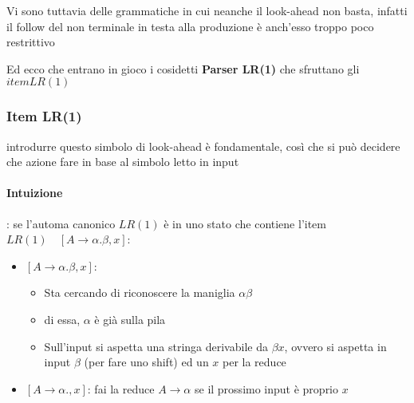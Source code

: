Vi sono tuttavia delle grammatiche in cui neanche il look-ahead non basta, infatti il follow del non terminale in testa alla produzione è anch'esso troppo poco restrittivo


Ed ecco che entrano in gioco i cosidetti \textbf{Parser LR(1)} che sfruttano gli $item LR(1)$
\subsubsection{Item LR(1)}
introdurre questo simbolo di look-ahead è fondamentale, così che si può decidere che azione fare in base al simbolo letto in input 

\paragraph{Intuizione}: se l'automa canonico $LR(1)$ è in uno stato che contiene l'item $LR(1)\quad [A\to\alpha.\beta,x]$:

\begin{itemize}
    \item $[A\to\alpha.\beta,x]$:
    \begin{itemize}
        \item Sta cercando di riconoscere la maniglia $\alpha \beta$
        \item di essa, $\alpha$ è già sulla pila
        \item Sull'input si aspetta una stringa derivabile da $\beta x$, ovvero si aspetta in input $\beta$ (per fare uno shift) ed un $x$ per la reduce
    \end{itemize}
    \item $[A\to\alpha.,x]$: fai la reduce $A\to \alpha$ se il prossimo input è proprio $x$
\end{itemize}
